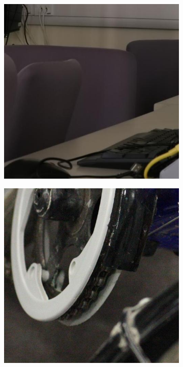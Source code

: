\begin{figure}
\begin{subfigure}[t]{0.19\textwidth}
    \end{subfigure}
    \hfill
    \begin{subfigure}[t]{0.19\textwidth}
        \centering
        \includegraphics[width=1\textwidth]{images/dataset/Canon80D_8_8_6400_comproom_11_mean.JPG}
    \end{subfigure}
    \hfill
    \begin{subfigure}[t]{0.19\textwidth}
        \centering
        \includegraphics[width=1\textwidth]{images/dataset/Canon5D2_5_160_6400_bicycle_6_real.JPG}

\end{subfigure}
\end{figure}
